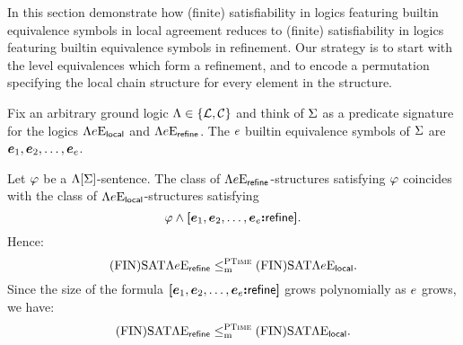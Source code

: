 
In this section demonstrate how (finite) satisfiability in logics featuring
builtin equivalence symbols in local agreement reduces to (finite)
satisfiability in logics featuring builtin equivalence symbols in refinement.
Our strategy is to start with the level equivalences which form a refinement,
and to encode a permutation specifying the local chain structure for every
element in the structure.

Fix an arbitrary ground logic $\Lambda \in \left\{\mathcal{L}, \mathcal{C}\right\}$ and think of $\mathrm{\Sigma}$ as
a predicate signature for the logics $\Lambda{e}\mathrm{E}_{\mathsf{local}}$ and
$\Lambda{e}\mathrm{E}_{\mathsf{refine}}$. The $e$ builtin equivalence symbols of $\mathrm{\Sigma}$ are
$\bm{e}_{1}, \bm{e}_{2}, \dots, \bm{e}_{e}$.

Let $\varphi$ be a $\Lambda[\mathrm{\Sigma}]$-sentence.
The class of $\Lambda{e}\mathrm{E}_{\mathsf{refine}}$-structures satisfying $\varphi$ coincides with
the class of $\Lambda{e}\mathrm{E}_{\mathsf{local}}$-structures satisfying
\[
  \varphi \land {\bm{[}\bm{e}_{1},\bm{e}_{2},\dots,\bm{e}_{e}\mathord{\bm{:}}\mathsf{refine}\bm{]}}.
\] 
Hence:
\[
  \mathrm{(FIN)SAT}\Lambda{e}\mathrm{E}_{\mathsf{refine}} \leq_{\mathrm{m}}^{\text{\normalfont{\scshape PTime}}} \mathrm{(FIN)SAT}\Lambda{e}\mathrm{E}_{\mathsf{local}}.
\]
Since the size of the formula ${\bm{[}\bm{e}_{1},\bm{e}_{2},\dots,\bm{e}_{e}\mathord{\bm{:}}\mathsf{refine}\bm{]}}$ grows 
polynomially as $e$ grows, we have:
\[
  \mathrm{(FIN)SAT}\Lambda{{}}\mathrm{E}_{\mathsf{refine}} \leq_{\mathrm{m}}^{\text{\normalfont{\scshape PTime}}} \mathrm{(FIN)SAT}\Lambda{{}}\mathrm{E}_{\mathsf{local}}.
\]

